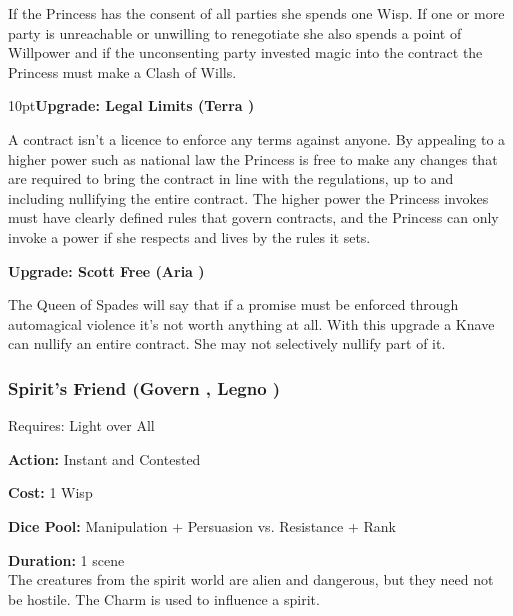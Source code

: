 If the Princess has the consent of all parties she spends one Wisp. If one or more party is unreachable or unwilling to renegotiate she also spends a point of Willpower and if the unconsenting party invested magic into the contract the Princess must make a Clash of Wills. 

\begin{myindentpar}{10pt}\textbf{Upgrade: Legal Limits (Terra \textbullet\textbullet\textbullet)}

A contract isn't a licence to enforce any terms against anyone. By appealing to a higher power such as national law the Princess is free to make any changes that are required to bring the contract in line with the regulations, up to and including nullifying the entire contract. The higher power the Princess invokes must have clearly defined rules that govern contracts, and the Princess can only invoke a power if she respects and lives by the rules it sets.

\textbf{Upgrade: Scott Free (Aria \textbullet\textbullet\textbullet)}

The Queen of Spades will say that if a promise must be enforced through automagical violence it's not worth anything at all. With this upgrade a Knave can nullify an entire contract. She may not selectively nullify part of it.\end{myindentpar}

\subsubsection*{Spirit's Friend (Govern \textbullet\textbullet\textbullet, Legno \textbullet\textbullet)}

\noindent Requires: Light over All

\noindent \textbf{Action:} Instant and Contested

\noindent \textbf{Cost:} 1 Wisp

\noindent \textbf{Dice Pool:} Manipulation + Persuasion vs. Resistance + Rank

\noindent \textbf{Duration:} 1 scene \\

\noindent The creatures from the spirit world are alien and dangerous, but they need not be hostile. The Charm is used to influence a spirit.

